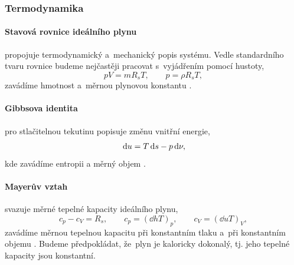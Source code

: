 
\subsubsection{Termodynamika}\label{sss:termodynamika}

\paragraph{Stavová rovnice ideálního plynu} propojuje termodynamický a~mechanický popis systému. Vedle standardního tvaru rovnice budeme nejčastěji pracovat s~vyjádřením pomocí hustoty,
\begin{equation}\label{eq:ideal_gas_law}
    p V = m R_s T, \qquad p=\rho R_s T,
\end{equation}
zavádíme hmotnost  a~měrnou plynovou konstantu .

\paragraph{Gibbsova identita} pro stlačitelnou tekutinu popisuje změnu vnitřní energie,
\begin{equation}\label{eq:gibbs_equation}
    \,\mathrm{d}{u}=T\,\mathrm{d}{s}-p\,\mathrm{d}{\nu},
\end{equation}
kde zavádíme entropii  a měrný objem \Unit{\nu}{\cubic\meter\per\kilogram}.

\paragraph{Mayerův vztah} svazuje měrné tepelné kapacity ideálního plynu,
\begin{equation}\label{eq:mayer}
    c_p - c_V = R_s, \qquad c_p=\left(\dd{h}{T}\right)_p, \qquad c_V=\left(\dd{u}{T}\right)_V,
\end{equation}
zavádíme měrnou tepelnou kapacitu při konstantním tlaku  a~při konstantním objemu . Budeme předpokládat, že~plyn je kaloricky dokonalý, tj. jeho tepelné kapacity jsou konstantní.

